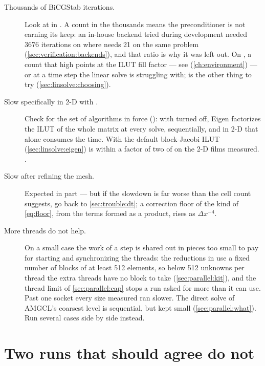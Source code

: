 \begin{description}
  \item[Thousands of BiCGStab iterations.] Look at  in
    . A count in the thousands means the preconditioner is
    not earning its keep: an in-house backend tried during development needed
    3676 iterations on  where  needs 21 on
    the same problem (\cref{sec:verification:backends}), and that ratio is why
    it was left out.
    On , a count that high points at the ILUT fill factor ---
    see  (\cref{ch:environment}) --- or at a time step
    the linear solve is struggling with;  is the other thing to
    try (\cref{sec:linsolve:choosing}).
  \item[Slow specifically in 2-D with .] Check 
    for the set of algorithms in force (): with 
    turned off, Eigen factorizes the ILUT of the whole matrix at every solve,
    sequentially, and in 2-D that alone consumes the time. With the default
    block-Jacobi ILUT (\cref{sec:linsolve:eigen})  is within a
    factor of two of  on the 2-D films measured.
    .
  \item[Slow after refining the mesh.] Expected in part --- but if the slowdown
    is far worse than the cell count suggests, go back to
    \cref{sec:trouble:dt}; a correction floor of the kind of
    \cref{eq:floor}, from the terms formed as a product, rises as
    $\Delta x^{-4}$.
  \item[More threads do not help.] On a small case the work of a step is
    shared out in pieces too small to pay for starting and synchronizing the
    threads: the reductions in  use a fixed number of blocks of
    at least 512 elements, so below 512 unknowns per thread the extra threads
    have no block to take (\cref{sec:parallel:kit}), and the thread limit of
    \cref{sec:parallel:cap} stops a run asked for more than it can use. Past
    one socket every size measured ran slower. The direct solve of AMGCL's
    coarsest level is sequential, but kept small (\cref{sec:parallel:what}).
    Run several cases side by side instead.
\end{description}

\section{Two runs that should agree do not}
\label{sec:trouble:diff}

